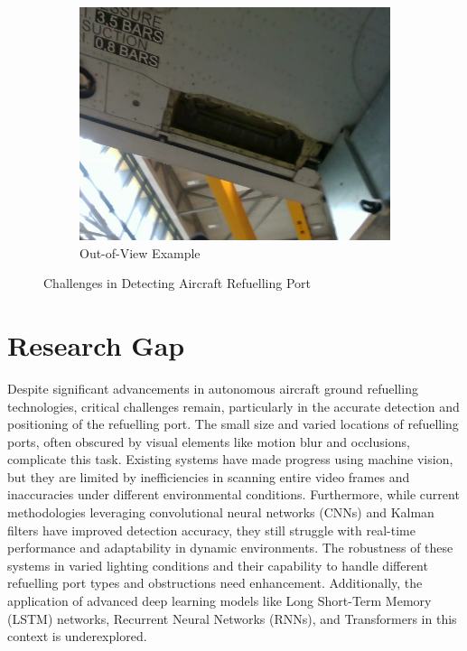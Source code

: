 \documentclass[12pt,oneside]{book} %
\begin{document}
\begin{figure}[H]
\begin{subfigure}[b]{0.3\textwidth}
        \includegraphics[height=0.7\textwidth, width=\textwidth]{figures/image_hard_3.jpg}
        \caption{Out-of-View Example}\label{fig:out-of-view-example}
    \end{subfigure}
    \caption{Challenges in Detecting Aircraft Refuelling Port}\label{fig:challenges-detecting-ports}
\end{figure}

\section{Research Gap}
Despite significant advancements in autonomous aircraft ground refuelling
technologies, critical challenges remain, particularly in the accurate
detection and positioning of the refuelling port. The small size and varied
locations of refuelling ports, often obscured by visual elements like motion
blur and occlusions, complicate this task. Existing systems have made progress
using machine vision, but they are limited by inefficiencies in scanning entire
video frames and inaccuracies under different environmental conditions.
Furthermore, while current methodologies leveraging convolutional neural
networks (CNNs) and Kalman filters have improved detection accuracy, they still
struggle with real-time performance and adaptability in dynamic environments.
The robustness of these systems in varied lighting conditions and their
capability to handle different refuelling port types and obstructions need
enhancement. Additionally, the application of advanced deep learning models
like Long Short-Term Memory (LSTM) networks, Recurrent Neural Networks (RNNs),
and Transformers in this context is underexplored. 
\end{document}
